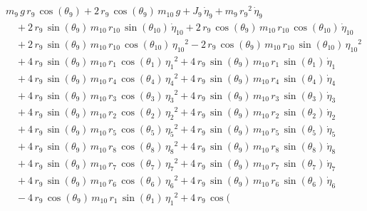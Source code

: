 \begin{eqnarray*} && m_{9}\,g\,r_{9}\,\cos({\theta_{9}}) + 2\,r_{9}\,
\cos({\theta_{9}})\,m_{10}\,g + J_{9}\,{\dot{\eta}_{9}} + m_{9}\,{r_{9
}}^2\,{\dot{\eta}_{9}} \\ &&\quad\mbox{} + 2\,r_{9}\,\sin({\theta_{9}}
)\,m_{10}\,r_{10}\,\sin({\theta_{10}})\,{\dot{\eta}_{10}} + 2\,r_{9}\,
\cos({\theta_{9}})\,m_{10}\,r_{10}\,\cos({\theta_{10}})\,{\dot{\eta}_{
10}} \\ &&\quad\mbox{} + 2\,r_{9}\,\sin({\theta_{9}})\,m_{10}\,r_{10}
\,\cos({\theta_{10}})\,{{\eta_{10}}}^2 - 2\,r_{9}\,\cos({\theta_{9}})
\,m_{10}\,r_{10}\,\sin({\theta_{10}})\,{{\eta_{10}}}^2
 \\ &&\quad\mbox{} + 4\,r_{9}\,\sin({\theta_{9}})\,m_{10}\,r_{1}\,\cos
({\theta_{1}})\,{{\eta_{1}}}^2 + 4\,r_{9}\,\sin({\theta_{9}})\,m_{10}
\,r_{1}\,\sin({\theta_{1}})\,{\dot{\eta}_{1}} \\ &&\quad\mbox{} + 4\,r
_{9}\,\sin({\theta_{9}})\,m_{10}\,r_{4}\,\cos({\theta_{4}})\,{{\eta_{4
}}}^2 + 4\,r_{9}\,\sin({\theta_{9}})\,m_{10}\,r_{4}\,\sin({\theta_{4}}
)\,{\dot{\eta}_{4}} \\ &&\quad\mbox{} + 4\,r_{9}\,\sin({\theta_{9}})\,
m_{10}\,r_{3}\,\cos({\theta_{3}})\,{{\eta_{3}}}^2 + 4\,r_{9}\,\sin({
\theta_{9}})\,m_{10}\,r_{3}\,\sin({\theta_{3}})\,{\dot{\eta}_{3}}
 \\ &&\quad\mbox{} + 4\,r_{9}\,\sin({\theta_{9}})\,m_{10}\,r_{2}\,\cos
({\theta_{2}})\,{{\eta_{2}}}^2 + 4\,r_{9}\,\sin({\theta_{9}})\,m_{10}
\,r_{2}\,\sin({\theta_{2}})\,{\dot{\eta}_{2}} \\ &&\quad\mbox{} + 4\,r
_{9}\,\sin({\theta_{9}})\,m_{10}\,r_{5}\,\cos({\theta_{5}})\,{{\eta_{5
}}}^2 + 4\,r_{9}\,\sin({\theta_{9}})\,m_{10}\,r_{5}\,\sin({\theta_{5}}
)\,{\dot{\eta}_{5}} \\ &&\quad\mbox{} + 4\,r_{9}\,\sin({\theta_{9}})\,
m_{10}\,r_{8}\,\cos({\theta_{8}})\,{{\eta_{8}}}^2 + 4\,r_{9}\,\sin({
\theta_{9}})\,m_{10}\,r_{8}\,\sin({\theta_{8}})\,{\dot{\eta}_{8}}
 \\ &&\quad\mbox{} + 4\,r_{9}\,\sin({\theta_{9}})\,m_{10}\,r_{7}\,\cos
({\theta_{7}})\,{{\eta_{7}}}^2 + 4\,r_{9}\,\sin({\theta_{9}})\,m_{10}
\,r_{7}\,\sin({\theta_{7}})\,{\dot{\eta}_{7}} \\ &&\quad\mbox{} + 4\,r
_{9}\,\sin({\theta_{9}})\,m_{10}\,r_{6}\,\cos({\theta_{6}})\,{{\eta_{6
}}}^2 + 4\,r_{9}\,\sin({\theta_{9}})\,m_{10}\,r_{6}\,\sin({\theta_{6}}
)\,{\dot{\eta}_{6}} \\ &&\quad\mbox{} - 4\,r_{9}\,\cos({\theta_{9}})\,
m_{10}\,r_{1}\,\sin({\theta_{1}})\,{{\eta_{1}}}^2 + 4\,r_{9}\,\cos({
}
\end{eqnarray*}
